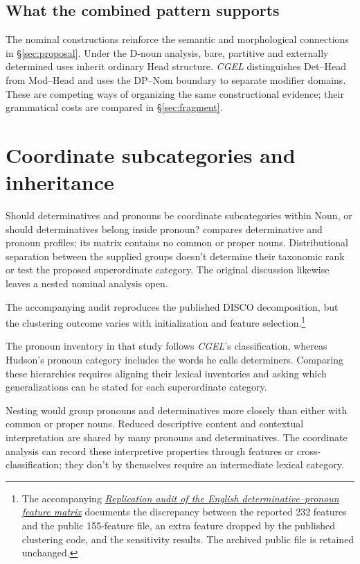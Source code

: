\documentclass[12pt]{article}
\begin{document}
\subsection{What the combined pattern supports}\label{sec:cumulative}

The nominal constructions reinforce the semantic and morphological connections in §\ref{sec:proposal}. Under the D-noun analysis, bare, partitive and externally determined uses inherit ordinary Head structure. \textit{CGEL} distinguishes Det--Head from Mod--Head and uses the DP--Nom boundary to separate modifier domains. These are competing ways of organizing the same constructional evidence; their grammatical costs are compared in §\ref{sec:fragment}.

\section{Coordinate subcategories and inheritance}\label{sec:inheritance}

Should determinatives and pronouns be coordinate subcategories within Noun, or should determinatives belong inside pronoun? \textcite{reynolds2021} compares determinative and pronoun profiles; its matrix contains no common or proper nouns. Distributional separation between the supplied groups doesn't determine their taxonomic rank or test the proposed superordinate category. The original discussion likewise leaves a nested nominal analysis open.

The accompanying audit reproduces the published DISCO decomposition, but the clustering outcome varies with initialization and feature selection.\footnote{The accompanying \href{run:matrix-audit.pdf}{\textit{Replication audit of the English determinative--pronoun feature matrix}} documents the discrepancy between the reported 232 features and the public 155-feature file, an extra feature dropped by the published clustering code, and the sensitivity results. The archived public file is retained unchanged.}

The pronoun inventory in that study follows \textit{CGEL}'s classification, whereas Hudson's pronoun category includes the words he calls determiners. Comparing these hierarchies requires aligning their lexical inventories and asking which generalizations can be stated for each superordinate category.

Nesting would group pronouns and determinatives more closely than either with common or proper nouns. Reduced descriptive content and contextual interpretation are shared by many pronouns and determinatives. The coordinate analysis can record these interpretive properties through features or cross-classification; they don't by themselves require an intermediate lexical category.
\end{document}
